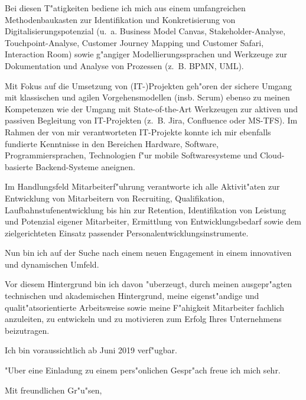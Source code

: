\documentclass[10pt,a4paper]{dinbrief}
\begin{document}
\begin{letter}
Bei diesen T"atigkeiten bediene ich mich aus einem umfangreichen Methodenbaukasten zur Identifikation und Konkretisierung von Digitalisierungspotenzial (u.~a. Business Model Canvas, Stakeholder-Analyse, Touchpoint-Analyse, Customer Journey Mapping und Customer Safari, Interaction Room) sowie g"angiger Modellierungssprachen und Werkzeuge zur Dokumentation und Analyse von Prozessen (z.~B. BPMN, UML).

Mit Fokus auf die Umsetzung von (IT-)Projekten geh"oren der sichere Umgang mit klassischen und agilen Vorgehensmodellen (insb. Scrum) ebenso zu meinen Kompetenzen wie der Umgang mit State-of-the-Art Werkzeugen zur aktiven und passiven Begleitung von IT-Projekten (z.~B. Jira, Confluence oder MS-TFS). Im Rahmen der von mir verantworteten IT-Projekte konnte ich mir ebenfalls fundierte Kenntnisse in den Bereichen Hardware, Software, Programmiersprachen, Technologien f"ur mobile Softwaresysteme und Cloud-basierte Backend-Systeme aneignen.

Im Handlungsfeld Mitarbeiterf"uhrung verantworte ich alle Aktivit"aten zur Entwicklung von Mitarbeitern von Recruiting, Qualifikation, Laufbahnstufenentwicklung bis hin zur Retention, Identifikation von Leistung und Potenzial eigener Mitarbeiter, Ermittlung von Entwicklungsbedarf sowie dem zielgerichteten Einsatz passender Personalentwicklungsinstrumente.

Nun bin ich auf der Suche nach einem neuen Engagement in einem innovativen und dynamischen Umfeld.

Vor diesem Hintergrund bin ich davon "uberzeugt, durch meinen ausgepr"agten technischen und akademischen Hintergrund, meine eigenst"andige und qualit"atsorientierte Arbeitsweise sowie meine F"ahigkeit Mitarbeiter fachlich anzuleiten, zu entwickeln und zu motivieren zum Erfolg Ihres Unternehmens beizutragen.

Ich bin voraussichtlich ab Juni 2019 verf"ugbar.

"Uber eine Einladung zu einem pers"onlichen Gespr"ach freue ich mich sehr.

\closing{Mit freundlichen Gr"u"sen,}
\end{letter}
\end{document}
